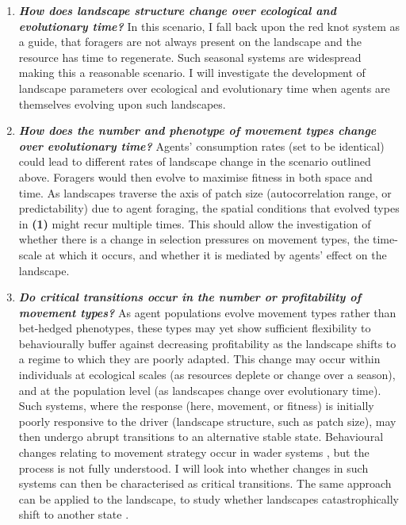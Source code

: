 \begin{enumerate}
  \begin{enumerate}
  \def\labelenumii{\alph{enumii}.}
  \item
    \textbf{\emph{How does landscape structure change over ecological and evolutionary time?}} In this scenario, I fall back upon the red knot system as a guide, that foragers are not always present on the landscape and the resource has time to regenerate. Such seasonal systems are widespread making this a reasonable scenario. I will investigate the development of landscape parameters over ecological and evolutionary time \citep[such as the autocorrelation range, or patch size; see][]{legendre1993} when agents are themselves evolving upon such landscapes.
  \item
    \textbf{\emph{How does the number and phenotype of movement types change over evolutionary time?}} Agents' consumption rates (set to be identical) could lead to different rates of landscape change in the scenario outlined above. Foragers would then evolve to maximise fitness in both space and time. As landscapes traverse the axis of patch size (autocorrelation range, or predictability) due to agent foraging, the spatial conditions that evolved types in \textbf{(1)} might recur multiple times. This should allow the investigation of whether there is a change in selection pressures on movement types, the time-scale at which it occurs, and whether it is mediated by agents' effect on the landscape.
  \item
    \textbf{\emph{Do critical transitions occur in the number or profitability of movement types?}} As agent populations evolve movement types rather than bet-hedged phenotypes, these types may yet show sufficient flexibility to behaviourally buffer against decreasing profitability as the landscape shifts to a regime to which they are poorly adapted. This change may occur within individuals at ecological scales (as resources deplete or change over a season), and at the population level (as landscapes change over evolutionary time). Such systems, where the response (here, movement, or fitness) is initially poorly responsive to the driver (landscape structure, such as patch size), may then undergo abrupt transitions \citep{scheffer2009} to an alternative stable state. Behavioural changes relating to movement strategy occur in wader systems \citep{oudman2018}, but the process is not fully understood. I will look into whether changes in such systems can then be characterised as critical transitions. The same approach can be applied to the landscape, to study whether landscapes catastrophically shift to another state \citep[as in][]{vandekoppel1997, jefferies2006}.
  \end{enumerate}
\end{enumerate}

